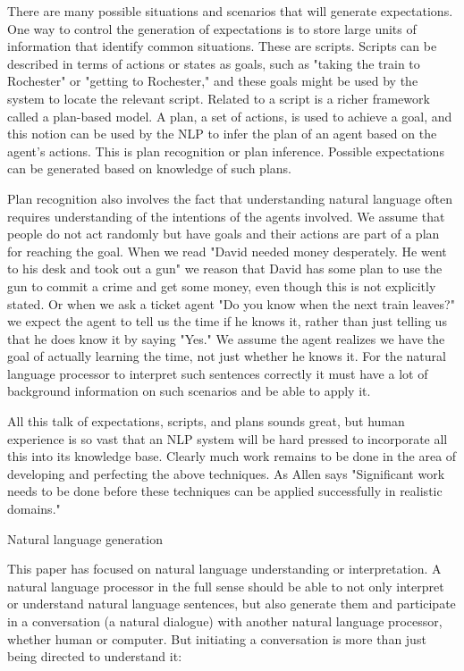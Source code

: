 There are many possible situations and scenarios that will generate expectations. One way to control the generation of expectations is to store large units of information that identify common situations. These are scripts. Scripts can be described in terms of actions or states as goals, such as "taking the train to Rochester" or "getting to Rochester," and these goals might be used by the system to locate the relevant script. Related to a script is a richer framework called a plan-based model. A plan, a set of actions, is used to achieve a goal, and this notion can be used by the NLP to infer the plan of an agent based on the agent's actions. This is plan recognition or plan inference. Possible expectations can be generated based on knowledge of such plans.

Plan recognition also involves the fact that understanding natural language often requires understanding of the intentions of the agents involved. We assume that people do not act randomly but have goals and their actions are part of a plan for reaching the goal. When we read "David needed money desperately. He went to his desk and took out a gun" we reason that David has some plan to use the gun to commit a crime and get some money, even though this is not explicitly stated. Or when we ask a ticket agent "Do you know when the next train leaves?" we expect the agent to tell us the time if he knows it, rather than just telling us that he does know it by saying "Yes." We assume the agent realizes we have the goal of actually learning the time, not just whether he knows it. For the natural language processor to interpret such sentences correctly it must have a lot of background information on such scenarios and be able to apply it.

All this talk of expectations, scripts, and plans sounds great, but human experience is so vast that an NLP system will be hard pressed to incorporate all this into its knowledge base. Clearly much work remains to be done in the area of developing and perfecting the above techniques. As Allen says "Significant work needs to be done before these techniques can be applied successfully in realistic domains."

Natural language generation

This paper has focused on natural language understanding or interpretation. A natural language processor in the full sense should be able to not only interpret or understand natural language sentences, but also generate them and participate in a conversation (a natural dialogue) with another natural language processor, whether human or computer. But initiating a conversation is more than just being directed to understand it:

